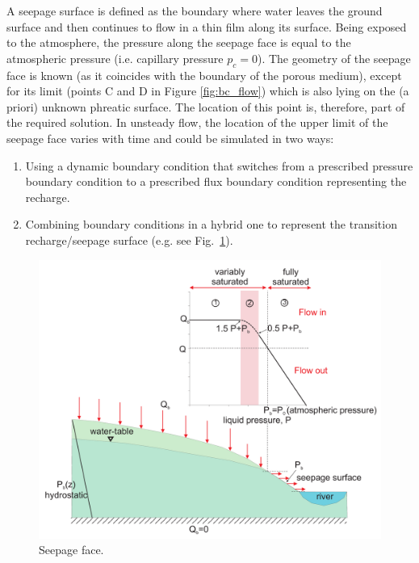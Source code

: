A seepage surface is defined as the boundary where water leaves the ground surface and then continues to flow in a thin film along its surface.
Being exposed to the atmosphere, the pressure along the seepage face is equal to the atmospheric pressure (i.e. capillary pressure $p_{c}=0$).
The geometry of the seepage face is known (as it coincides with the boundary of the porous medium), except for its limit (points C and D in Figure \ref{fig:bc_flow}) which is also lying on the (a priori) unknown phreatic surface.
The location of this point is, therefore, part of the required solution.
In unsteady flow, the location of the upper limit of the seepage face varies with time
and could be simulated in two ways:
\begin{enumerate}
\item Using a dynamic boundary condition that switches from a prescribed pressure boundary condition
to a prescribed flux boundary condition representing the recharge.
\item Combining boundary conditions in a hybrid one to represent the transition recharge/seepage 
surface (e.g. see Fig.~\ref{fig:seepage_bc}).
\end{enumerate}

\begin{figure}  [h]
\begin{center}
\includegraphics[scale=0.3]{figs/seepage_bc.pdf}
\caption{Seepage face.}
\label{fig:seepage_bc}
\end{center}
\end{figure}

